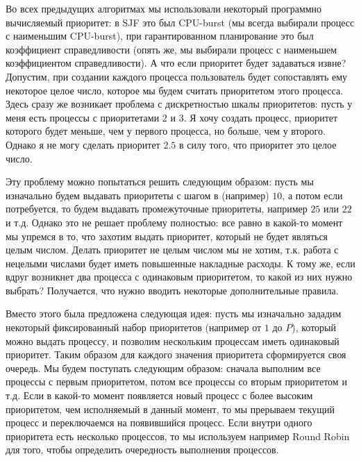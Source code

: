 
Во всех предыдущих алгоритмах мы использовали некоторый программно вычисляемый
приоритет: в SJF это был CPU-burst (мы всегда выбирали процесс с наименьшим
CPU-burst), при гарантированном планирование это был коэффициент справедливости
(опять же, мы выбирали процесс с наименьшем коэффициентом справедливости). А что
если приоритет будет задаваться извне? Допустим, при создании каждого процесса
пользователь будет сопоставлять ему некоторое целое число, которое мы будем
считать приоритетом этого процесса. Здесь сразу же возникает проблема с
дискретностью шкалы приоритетов: пусть у меня есть процессы с приоритетами \(2\)
и \(3\). Я хочу создать процесс, приоритет которого будет меньше, чем у
первого процесса, но больше, чем у второго. Однако я не могу сделать приоритет
\(2.5\) в силу того, что приоритет это целое число.

Эту проблему можно попытаться решить следующим образом: пусть мы изначально
будем выдавать приоритеты с шагом в (например) \(10\), а потом если потребуется,
то будем выдавать промежуточные приоритеты, например \(25\) или \(22\) и т.д.
Однако это не решает проблему полностью: все равно в какой-то момент мы упремся
в то, что захотим выдать приоритет, который не будет являться целым числом.
Делать приоритет не целым числом мы не хотим, т.к. работа с нецелыми числами
будет иметь повышенные накладные расходы. К тому же, если вдруг возникнет два
процесса с одинаковым приоритетом, то какой из них нужно выбрать? Получается,
что нужно вводить некоторые дополнительные правила.

Вместо этого была предложена следующая идея: пусть мы изначально зададим
некоторый фиксированный набор приоритетов (например от \(1\) до \(P\)), который
можно выдать процессу, и позволим нескольким процессам иметь одинаковый
приоритет. Таким образом для каждого значения приоритета сформируется своя
очередь. Мы будем поступать следующим образом: сначала выполним все процессы
с первым приоритетом, потом все процессы со вторым приоритетом и т.д. Если в
какой-то момент появляется новый процесс с более высоким приоритетом, чем
исполняемый в данный момент, то мы прерываем текущий процесс и переключаемся на
появившийся процесс. Если внутри одного приоритета есть несколько
процессов, то мы используем например Round Robin для того, чтобы определить
очередность выполнения процессов.


